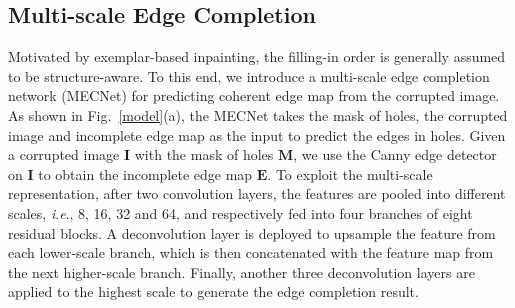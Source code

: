 \documentclass[10pt,journal,compsoc]{IEEEtran}
\newcommand{\ie}{\textit{i}.\textit{e}.}
\begin{document}
\subsection{Multi-scale Edge Completion}\label{sec2}
%
Motivated by exemplar-based inpainting, the filling-in order is generally assumed to be structure-aware.
%
To this end, we introduce a multi-scale edge completion network (MECNet) for predicting coherent edge map from the corrupted image.
%
As shown in Fig.~\ref{model}(a), the MECNet takes the mask of holes, the corrupted
image and incomplete edge map as the input to predict the edges in holes.
%
%
%
%
Given a corrupted image $\mathbf{I}$ with the mask of holes $\mathbf{M}$, we use the Canny edge detector on $\mathbf{I}$ to obtain the incomplete edge map $\mathbf{E}$.
%
To exploit the multi-scale representation, after two convolution layers, the features are pooled into different scales, \ie, 8, 16, 32 and 64, and respectively fed into four branches of eight residual blocks.
%
A deconvolution layer is deployed to upsample the feature from each lower-scale branch, which is then concatenated with the feature map from the next higher-scale branch.
%
Finally, another three deconvolution layers are applied to the highest scale to generate the edge completion result.


\end{document}
